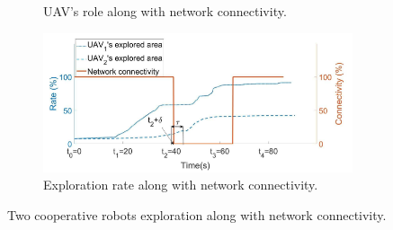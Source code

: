 \documentclass[11pt,openany]{book}
\begin{document}
\begin{algorimth}[H]
\begin{figure}[H]
\begin{subfigure}[H]{0.8\linewidth}
        \caption{{UAV’s role along with network connectivity.}}
        \label{fig:4.11a}
    \end{subfigure}
    \begin{subfigure}[H]{0.8\linewidth}
        \includegraphics[width=\linewidth]{assets/4_11_b.png}
        \caption{{Exploration rate along with network connectivity.}}
        \label{fig:4.11b}
    \end{subfigure}
    \caption{{Two cooperative robots exploration along with network connectivity.}}
    \label{fig:4.11}
\end{figure}

\end{algorimth}
\end{document}
